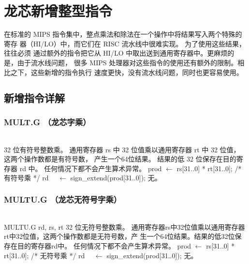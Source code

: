 \chapter{龙芯新增整型指令}

在标准的 MIPS 指令集中，整点乘法和除法在一个操作中将结果写入两个特殊的寄存
器（HI/LO）中，而它们在 RISC 流水线中很难实现。 为了使用这些结果，往往必须
通过额外的指令把它从 HI/LO 中取出送到通用寄存器中。更麻烦的是，由于流水线问题，
很多 MIPS 处理器对这些指令的使用还有额外的限制。相比之下，这些新增的指令执行
速度更快，没有流水线问题，同时也更容易使用。

\section{新增指令详解}

\subsection{MULT.G （龙芯字乘）}

\begin{instructionblk}
   \\
  {32 位有符号整数乘。}
  {通用寄存器 rs 中 32 位值乘以通用寄存器 rt 中 32 位值，
  这两个操作数都是有符号数， 产生一个64位结果。 结果的低
  32 位保存在目的寄存器 rd 中。 \fldnewline
  任何情况下都不会产生算术异常。}
  {prod $\leftarrow$ rs[31..0] * rt[31..0]; /* 有符号乘 */ \newline
  rd~~ $\leftarrow$ sign\_extend(prod[31..0]);}
  {无。}
\end{instructionblk}

\subsection{MULTU.G （龙芯无符号字乘）}

\begin{instructionblk}
   \\
  \instructionbody
  {MULTU.G rd, rs, rt}
  {32 位无符号整数乘。}
  {通用寄存器rs中32位值乘以通用寄存器rt中32位值，这两个操作数都是无符号数，产
  生一个64位结果。结果的低32位保存在目的寄存器rd中。 \fldnewline
  任何情况下都不会产生算术异常。}
  {prod $\leftarrow$ rs[31..0] * rt[31..0]; /* 无符号乘 */ \newline
  rd~~ $\leftarrow$ sign\_extend(prod[31..0]);}
  {无。}
\end{instructionblk}

